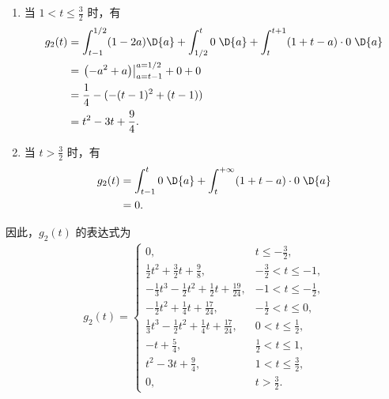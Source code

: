 \begin{solution}
\begin{enumerate}[label=(\arabic*)]
\begin{enumerate}
                \item 当 $1 < t \le \frac{3}{2}$ 时，有
                    \begin{align*}
                        g_2(t) & = \int_{t - 1}^{1/2}(1 - 2a)\D{a} + \int_{1/2}^{t}0\;\D{a} + \int_{t}^{t + 1}(1 + t - a)\cdot 0\;\D{a} \\
                        & = \left.\left(-a^2 + a\right)\right|_{a = t - 1}^{a = 1/2} + 0 + 0 \\
                        & = \frac{1}{4} - (-(t - 1)^2 + (t - 1)) \\
                        & = t^2 - 3t + \frac{9}{4}.
                    \end{align*}
                \item 当 $t > \frac{3}{2}$ 时，有
                    \begin{align*}
                        g_2(t) & = \int_{t - 1}^{t}0\;\D{a} + \int_{t}^{+\infty}(1 + t - a)\cdot 0\;\D{a} \\
                        & = 0.
                    \end{align*}
            \end{enumerate}

            因此，$g_2(t)$ 的表达式为
            \begin{align*}
                g_2(t) = \begin{cases}
                    0, & t \le -\frac{3}{2}, \\
                    \frac{1}{2}t^2 + \frac{3}{2}t + \frac{9}{8}, & -\frac{3}{2} < t \le -1, \\
                    -\frac{1}{3}t^3 - \frac{1}{2}t^2 + \frac{1}{2}t + \frac{19}{24}, & -1 < t \le -\frac{1}{2}, \\
                    -\frac{1}{2}t^2 + \frac{1}{4}t + \frac{17}{24}, & -\frac{1}{2} < t \le 0, \\
                    \frac{1}{3}t^3 - \frac{1}{2}t^2 + \frac{1}{4}t + \frac{17}{24}, & 0 < t \le \frac{1}{2}, \\
                    -t + \frac{5}{4}, & \frac{1}{2} < t \le 1, \\
                    t^2 - 3t + \frac{9}{4}, & 1 < t \le \frac{3}{2}, \\
                    0, & t > \frac{3}{2}.
                \end{cases}
            \end{align*}


\end{enumerate}
\end{solution}
